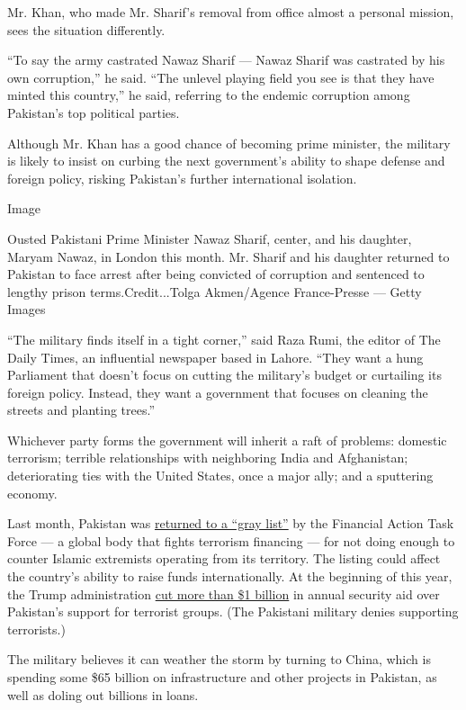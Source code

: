Mr. Khan, who made Mr. Sharif's removal from office almost a personal
mission, sees the situation differently.

``To say the army castrated Nawaz Sharif --- Nawaz Sharif was castrated
by his own corruption,'' he said. ``The unlevel playing field you see is
that they have minted this country,'' he said, referring to the endemic
corruption among Pakistan's top political parties.

Although Mr. Khan has a good chance of becoming prime minister, the
military is likely to insist on curbing the next government's ability to
shape defense and foreign policy, risking Pakistan's further
international isolation.

Image

Ousted Pakistani Prime Minister Nawaz Sharif, center, and his daughter,
Maryam Nawaz, in London this month. Mr. Sharif and his daughter returned
to Pakistan to face arrest after being convicted of corruption and
sentenced to lengthy prison terms.Credit...Tolga Akmen/Agence
France-Presse --- Getty Images

``The military finds itself in a tight corner,'' said Raza Rumi, the
editor of The Daily Times, an influential newspaper based in Lahore.
``They want a hung Parliament that doesn't focus on cutting the
military's budget or curtailing its foreign policy. Instead, they want a
government that focuses on cleaning the streets and planting trees.''

Whichever party forms the government will inherit a raft of problems:
domestic terrorism; terrible relationships with neighboring India and
Afghanistan; deteriorating ties with the United States, once a major
ally; and a sputtering economy.

Last month, Pakistan was
\href{https://www.nytimes.com/2018/03/01/world/asia/pakistan-terrorism-china-saudi-arabia.html}{returned
to a ``gray list''} by the Financial Action Task Force --- a global body
that fights terrorism financing --- for not doing enough to counter
Islamic extremists operating from its territory. The listing could
affect the country's ability to raise funds internationally. At the
beginning of this year, the Trump administration
\href{https://www.nytimes.com/2018/01/04/us/politics/trump-pakistan-aid.html}{cut
more than \$1 billion} in annual security aid over Pakistan's support
for terrorist groups. (The Pakistani military denies supporting
terrorists.)

The military believes it can weather the storm by turning to China,
which is spending some \$65 billion on infrastructure and other projects
in Pakistan, as well as doling out billions in loans.

